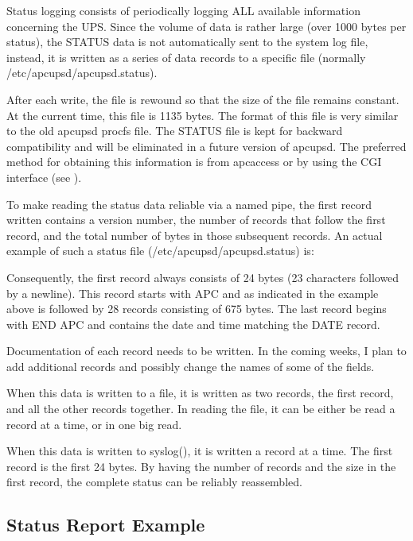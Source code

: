 {{{{{{{{{{{Status logging consists of periodically logging ALL available information
concerning the UPS. Since the volume of data is rather large (over 1000 bytes
per status), the STATUS data is not automatically sent to the system log file,
instead, it is written as a series of data records to a specific file
(normally /etc/apcupsd/apcupsd.status).  

After each write, the file is rewound so that the size of the file remains
constant. At the current time, this file is 1135 bytes. The format of this
file is very similar to the old apcupsd procfs file. The STATUS file is kept
for backward compatibility and will be eliminated in a future version of
apcupsd. The preferred method for obtaining this information is from apcaccess
or by using the CGI interface (see 
).  

To make reading the status data reliable via a named pipe, the first record
written contains a version number, the number of records that follow the first
record, and the total number of bytes in those subsequent records. An actual
example of such a status file (/etc/apcupsd/apcupsd.status) is:  

Consequently, the first record always consists of 24 bytes (23 characters
followed by a newline). This record starts with APC and as indicated in the
example above is followed by 28 records consisting of 675 bytes. The last
record begins with END APC and contains the date and time matching the DATE
record.  

Documentation of each record needs to be written. In the coming weeks, I plan
to add additional records and possibly change the names of some of the fields.
 

When this data is written to a file, it is written as two records, the first
record, and all the other records together. In reading the file, it can be
either be read a record at a time, or in one big read.  

When this data is written to syslog(), it is written a record at a time. The
first record is the first 24 bytes. By having the number of records and the
size in the first record, the complete status can be reliably reassembled. 

\label{Status-Report-Example}

\subsection*{Status Report Example}

}}}}}}}}}}}
